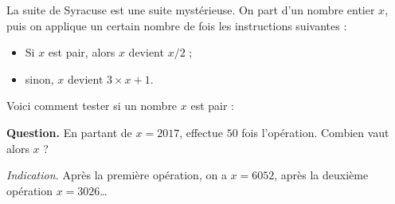 \documentclass[class=report,crop=false, 12pt]{standalone}
\begin{document}


\begin{enigme}

La suite de Syracuse est une suite mystérieuse.
On part d'un nombre entier $x$, puis on applique un certain nombre de fois les instructions suivantes :
\begin{itemize}
  \item Si $x$ est pair, alors $x$ devient $x/2$ ;
  \item sinon, $x$ devient $3\times x + 1$.
\end{itemize}


\bigskip

Voici comment tester si un nombre $x$ est pair :
\begin{center}
\end{center}

\textbf{Question.} En partant de $x=2017$, effectue $50$ fois l'opération. Combien vaut alors $x$ ?

\emph{Indication.} Après la première opération, on a $x=6052$, après la deuxième opération $x=3026$\ldots

\bigskip


\end{enigme}
\end{document}
